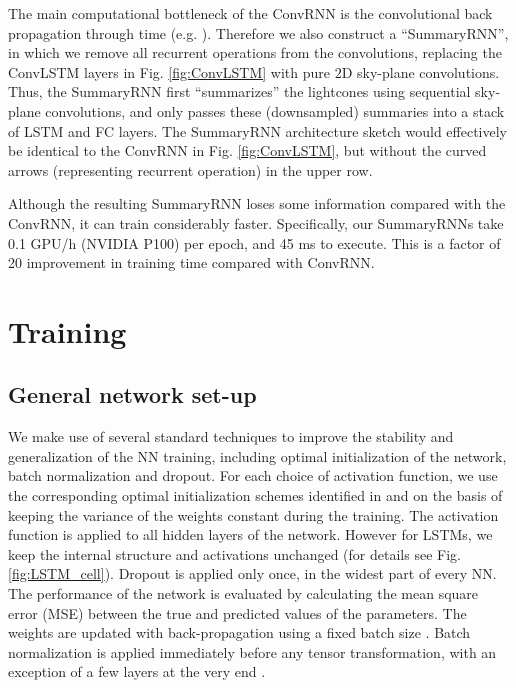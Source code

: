 \documentclass[fleqn,usenatbib]{mnras}
\begin{document}
The main computational bottleneck of the ConvRNN is the convolutional back propagation through time (e.g. \citealt{BPTT}). Therefore we also construct a ``SummaryRNN'', in which we remove all recurrent operations from the convolutions, replacing the ConvLSTM layers in Fig. \ref{fig:ConvLSTM} with pure $2\mathrm{D}$ sky-plane convolutions. Thus, the SummaryRNN first ``summarizes'' the lightcones using sequential sky-plane convolutions, and only passes these (downsampled) summaries into a stack of LSTM and FC layers.  The SummaryRNN architecture sketch would effectively be identical to the ConvRNN in Fig. \ref{fig:ConvLSTM}, but without the curved arrows (representing recurrent operation) in the upper row.

Although the resulting SummaryRNN loses some information compared with the ConvRNN, it can train considerably faster.  Specifically, our SummaryRNNs take 0.1 GPU/h (NVIDIA P100) per epoch, and 45 ms to execute.  This is a factor of 20 improvement in training time compared with ConvRNN.

\section{Training} \label{sec:training}

\subsection{General network set-up} \label{subsec:network_setup}

We make use of several standard techniques to improve the stability and generalization of the NN training, including optimal initialization of the network, batch normalization and dropout. 
For each choice of activation function, we use the corresponding optimal initialization schemes identified in \citet{lecun2015deeplearning} and \citet{he15} on the basis of keeping the variance of the weights constant during the training. The activation function is applied to all hidden layers of the network. However for LSTMs, we keep the internal structure and activations unchanged (for details see Fig. \ref{fig:LSTM_cell}).  Dropout \citep{srivastava14} is applied only once, in the widest part of every NN. The performance of the network is evaluated by calculating the mean square error (MSE) between the true and predicted values of the parameters. The weights are updated with back-propagation using a fixed batch size \citep{10.5555/65669.104451}. Batch normalization is applied immediately before any tensor transformation, with an exception of a few layers at the very end \citep{ioffe15}.
\end{document}
